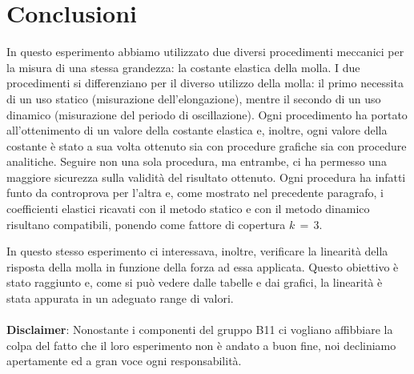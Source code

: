 \section{Conclusioni}
In questo esperimento abbiamo utilizzato due diversi procedimenti meccanici per la misura di una stessa grandezza: la costante elastica della molla. I due procedimenti si differenziano per il diverso utilizzo della molla: il primo necessita di un uso statico (misurazione dell'elongazione), mentre il secondo di un uso dinamico (misurazione del periodo di oscillazione). Ogni procedimento ha portato all'ottenimento di un valore della costante elastica e, inoltre, ogni valore della costante è stato a sua volta ottenuto sia con procedure grafiche sia con procedure analitiche.
Seguire non una sola procedura, ma entrambe, ci ha permesso una maggiore sicurezza sulla validità del risultato ottenuto. Ogni procedura ha infatti funto da controprova per l'altra e, come mostrato nel precedente paragrafo, i coefficienti elastici ricavati con il metodo statico e con il metodo dinamico risultano compatibili, ponendo come fattore di copertura $k\,=\,3$.

In questo stesso esperimento ci interessava, inoltre, verificare la linearità della risposta della molla in funzione della forza ad essa applicata. Questo obiettivo è stato raggiunto e, come si può vedere dalle tabelle e dai grafici, la linearità è stata appurata in un adeguato range di valori.
\\
\\


\textbf{Disclaimer}: Nonostante i componenti del gruppo B11 ci vogliano affibbiare la colpa del fatto che il loro esperimento non è andato a buon fine, noi decliniamo apertamente ed a gran voce ogni responsabilità.